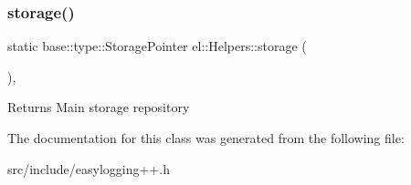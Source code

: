 \subsubsection{\texorpdfstring{storage()}{storage()}}
{\footnotesize\ttfamily static base\+::type\+::\+Storage\+Pointer el\+::\+Helpers\+::storage (\begin{DoxyParamCaption}{ }\end{DoxyParamCaption})\hspace{0.3cm}{\ttfamily [inline]}, {\ttfamily [static]}}

\begin{DoxyReturn}{Returns}
Main storage repository 
\end{DoxyReturn}


The documentation for this class was generated from the following file\+:\begin{DoxyCompactItemize}
\item 
src/include/easylogging++.\+h\end{DoxyCompactItemize}
